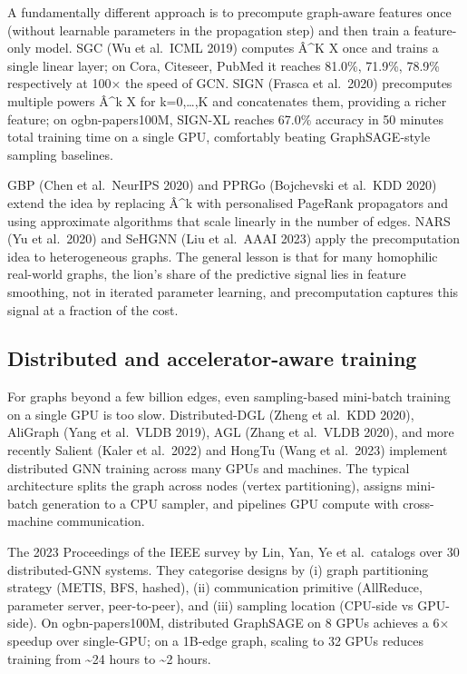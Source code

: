 A fundamentally different approach is to precompute graph-aware features once (without learnable parameters in the propagation step) and then train a feature-only model. SGC (Wu et al.~ICML 2019) computes Â\^{}K X once and trains a single linear layer; on Cora, Citeseer, PubMed it reaches 81.0\%, 71.9\%, 78.9\% respectively at 100× the speed of GCN. SIGN (Frasca et al.~2020) precomputes multiple powers Â\^{}k X for k=0,\ldots,K and concatenates them, providing a richer feature; on ogbn-papers100M, SIGN-XL reaches 67.0\% accuracy in 50 minutes total training time on a single GPU, comfortably beating GraphSAGE-style sampling baselines.

GBP (Chen et al.~NeurIPS 2020) and PPRGo (Bojchevski et al.~KDD 2020) extend the idea by replacing Â\^{}k with personalised PageRank propagators and using approximate algorithms that scale linearly in the number of edges. NARS (Yu et al.~2020) and SeHGNN (Liu et al.~AAAI 2023) apply the precomputation idea to heterogeneous graphs. The general lesson is that for many homophilic real-world graphs, the lion's share of the predictive signal lies in feature smoothing, not in iterated parameter learning, and precomputation captures this signal at a fraction of the cost.

\subsection{Distributed and accelerator-aware training}\label{distributed-and-accelerator-aware-training}

For graphs beyond a few billion edges, even sampling-based mini-batch training on a single GPU is too slow. Distributed-DGL (Zheng et al.~KDD 2020), AliGraph (Yang et al.~VLDB 2019), AGL (Zhang et al.~VLDB 2020), and more recently Salient (Kaler et al.~2022) and HongTu (Wang et al.~2023) implement distributed GNN training across many GPUs and machines. The typical architecture splits the graph across nodes (vertex partitioning), assigns mini-batch generation to a CPU sampler, and pipelines GPU compute with cross-machine communication.

The 2023 Proceedings of the IEEE survey by Lin, Yan, Ye et al.~catalogs over 30 distributed-GNN systems. They categorise designs by (i) graph partitioning strategy (METIS, BFS, hashed), (ii) communication primitive (AllReduce, parameter server, peer-to-peer), and (iii) sampling location (CPU-side vs GPU-side). On ogbn-papers100M, distributed GraphSAGE on 8 GPUs achieves a 6× speedup over single-GPU; on a 1B-edge graph, scaling to 32 GPUs reduces training from \textasciitilde24 hours to \textasciitilde2 hours.

